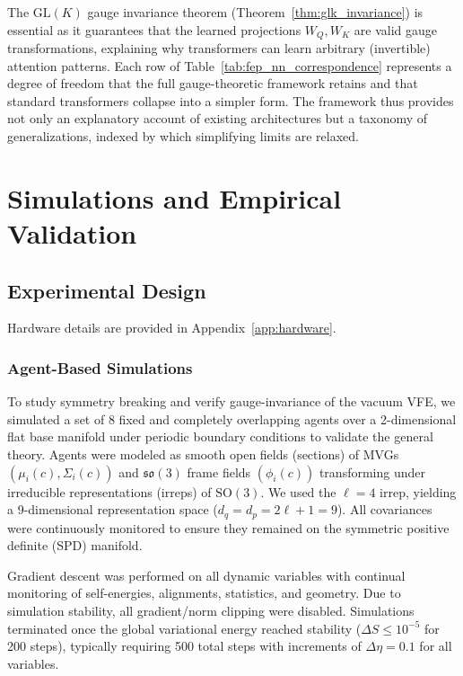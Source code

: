 \documentclass[twoside,11pt]{article}
\begin{document}
The $\mathrm{GL}(K)$ gauge invariance theorem (Theorem~\ref{thm:glk_invariance}) is essential as it guarantees that the learned projections $W_Q, W_K$ are valid gauge transformations, explaining why transformers can learn arbitrary (invertible) attention patterns. Each row of Table~\ref{tab:fep_nn_correspondence} represents a degree of freedom that the full gauge-theoretic framework retains and that standard transformers collapse into a simpler form. The framework thus provides not only an explanatory account of existing architectures but a taxonomy of generalizations, indexed by which simplifying limits are relaxed.


\section{Simulations and Empirical Validation}

\subsection{Experimental Design}

Hardware details are provided in Appendix~\ref{app:hardware}.

\subsubsection{Agent-Based Simulations}
To study symmetry breaking and verify gauge-invariance of the vacuum VFE, we simulated a set of 8 fixed and completely overlapping agents over a 2-dimensional flat base manifold under periodic boundary conditions to validate the general theory. Agents were modeled as smooth open fields (sections) of MVGs $(\mu_i(c), \Sigma_i(c))$ and $\mathfrak{so}(3)$ frame fields $(\phi_i(c))$ transforming under irreducible representations (irreps) of $\mathrm{SO}(3)$. We used the $\ell = 4$ irrep, yielding a 9-dimensional representation space ($d_q = d_p = 2\ell + 1 = 9$). All covariances were continuously monitored to ensure they remained on the symmetric positive definite (SPD) manifold.

Gradient descent was performed on all dynamic variables with continual monitoring of self-energies, alignments, statistics, and geometry. Due to simulation stability, all gradient/norm clipping were disabled. Simulations terminated once the global variational energy reached stability ($\Delta S \leq 10^{-5}$ for 200 steps), typically requiring 500 total steps with increments of $\Delta \eta = 0.1$ for all variables.
\end{document}
